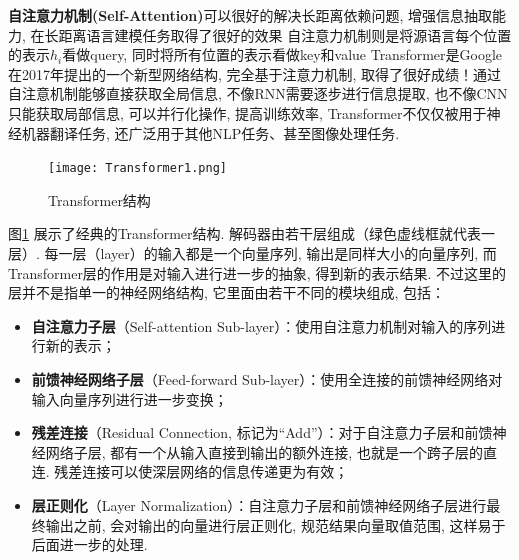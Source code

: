 \textbf{自注意力机制(Self-Attention)}可以很好的解决长距离依赖问题, 增强信息抽取能力, 在长距离语言建模任务取得了很好的效果
 自注意力机制则是将源语言每个位置的表示$h_i$看做query, 同时将所有位置的表示看做key和value
 Transformer是Google在2017年提出的一个新型网络结构, 完全基于注意力机制, 取得了很好成绩！通过自注意机制能够直接获取全局信息, 不像RNN需要逐步进行信息提取, 也不像CNN只能获取局部信息, 可以并行化操作, 提高训练效率, Transformer不仅仅被用于神经机器翻译任务, 还广泛用于其他NLP任务、甚至图像处理任务. 
\begin{figure}[ht]
    \centering
\texttt{[image: Transformer1.png]}
    \caption{Transformer结构}
    \label{Transformer}
    \end{figure}
    \parinterval 图\ref{Transformer} 展示了经典的Transformer结构. 解码器由若干层组成（绿色虚线框就代表一层）. 每一层（layer）的输入都是一个向量序列, 输出是同样大小的向量序列, 而Transformer层的作用是对输入进行进一步的抽象, 得到新的表示结果. 不过这里的层并不是指单一的神经网络结构, 它里面由若干不同的模块组成, 包括：
    \begin{itemize}
        \vspace{0.5em}
        \item {\small\sffamily\bfseries{自注意力子层}}（Self-attention Sub-layer）：使用自注意力机制对输入的序列进行新的表示；
        \vspace{0.5em}
        \item {\small\sffamily\bfseries{前馈神经网络子层}}（Feed-forward Sub-layer）：使用全连接的前馈神经网络对输入向量序列进行进一步变换；
        \vspace{0.5em}
        \item {\small\sffamily\bfseries{残差连接}}（Residual Connection, 标记为``Add''）：对于自注意力子层和前馈神经网络子层, 都有一个从输入直接到输出的额外连接, 也就是一个跨子层的直连. 残差连接可以使深层网络的信息传递更为有效；
        \vspace{0.5em}
        \item {\small\sffamily\bfseries{层正则化}}（Layer Normalization）：自注意力子层和前馈神经网络子层进行最终输出之前, 会对输出的向量进行层正则化, 规范结果向量取值范围, 这样易于后面进一步的处理. 
        \vspace{0.5em}
        \end{itemize}


